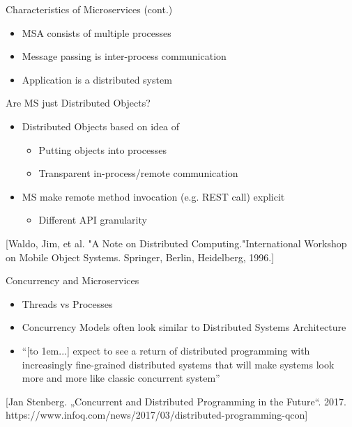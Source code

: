 \documentclass{beamer}
\newcommand\mydots{\hbox to 1em{.\hss.\hss.}}
\begin{document}
\begin{frame}{Characteristics of Microservices (cont.)}

  \begin{itemize}
    \item MSA consists of multiple processes 
    \item Message passing is inter-process communication
    \item Application is a distributed system
  \end{itemize}

\end{frame}

\begin{frame}{Are MS just Distributed Objects?}

  \begin{itemize}
    \item Distributed Objects based on idea of 

    \begin{itemize}
      \item Putting objects into processes
      \item Transparent in-process/remote communication
    \end{itemize}
    
    \pause
    
    \item MS make remote method invocation (e.g. REST call) explicit
    \begin{itemize}
      \item Different API granularity
    \end{itemize}

  \end{itemize}
  
  \vskip 2cm

\tiny{[Waldo, Jim, et al. "A Note on Distributed Computing."International Workshop on Mobile Object Systems. Springer, Berlin, Heidelberg, 1996.]}

\end{frame}

\begin{frame}{Concurrency and Microservices}

  \begin{itemize}
    \item Threads vs Processes
	\pause 
    \item Concurrency Models often look similar to Distributed Systems Architecture
	\pause
    \item ``[\mydots] expect to see a return of distributed programming with increasingly fine-grained distributed systems that will make systems look more and more like classic concurrent system''

  \end{itemize}
  
  \vskip 2cm

\tiny{[Jan Stenberg. „Concurrent and Distributed Programming in the Future“. 2017. https://www.infoq.com/news/2017/03/distributed-programming-qcon]}

\end{frame}
\end{document}
